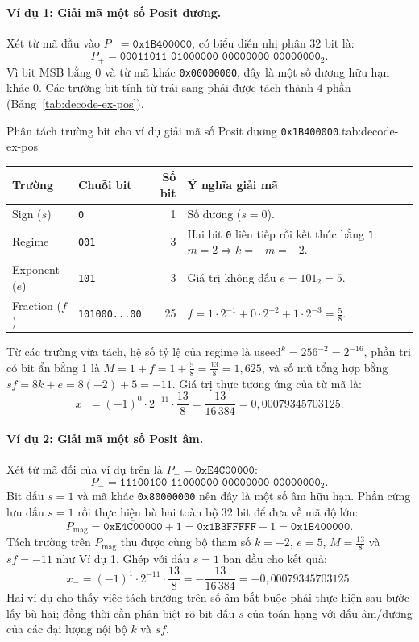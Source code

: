 \paragraph{Ví dụ 1: Giải mã một số Posit dương.}
Xét từ mã đầu vào $P_+ = \texttt{0x1B400000}$, có biểu diễn nhị phân 32 bit là:
\[
P_+ = \texttt{00011011\ 01000000\ 00000000\ 00000000}_2.
\]
Vì bit MSB bằng $0$ và từ mã khác \texttt{0x00000000}, đây là một số dương hữu
hạn khác $0$. Các trường bit tính từ trái sang phải được tách thành 4 phần (Bảng~\ref{tab:decode-ex-pos}).

\begin{engineeringtable}{Phân tách trường bit cho ví dụ giải mã số Posit dương \texttt{0x1B400000}.}{tab:decode-ex-pos}
\begin{tabularx}{\linewidth}{@{}>{\raggedright\arraybackslash}p{26mm} l r Y@{}}
\toprule
Trường & Chuỗi bit & Số bit & Ý nghĩa giải mã \\
\midrule
Sign ($s$) & \texttt{0} & 1 & Số dương ($s=0$). \\
Regime & \texttt{001} & 3 & Hai bit \texttt{0} liên tiếp rồi kết thúc bằng \texttt{1}: $m=2 \Rightarrow k=-m=-2$. \\
Exponent ($e$) & \texttt{101} & 3 & Giá trị không dấu $e = 101_2 = 5$. \\
Fraction ($f$) & \texttt{101000...00} & 25 & $f = 1\cdot 2^{-1} + 0\cdot 2^{-2} + 1\cdot 2^{-3} = \frac{5}{8}$. \\
\bottomrule
\end{tabularx}
\end{engineeringtable}

Từ các trường vừa tách, hệ số tỷ lệ của regime là $\mathrm{useed}^k = 256^{-2} = 2^{-16}$,
phần trị có bit ẩn bằng 1 là $M = 1 + f = 1 + \frac{5}{8} = \frac{13}{8} = 1{,}625$,
và số mũ tổng hợp bằng $sf = 8k + e = 8(-2) + 5 = -11$. Giá trị thực tương ứng của
từ mã là:
\[
x_+ = (-1)^0 \cdot 2^{-11} \cdot \frac{13}{8} = \frac{13}{16\,384} = 0{,}00079345703125.
\]

\paragraph{Ví dụ 2: Giải mã một số Posit âm.}
Xét từ mã đối của ví dụ trên là $P_- = \texttt{0xE4C00000}$:
\[
P_- = \texttt{11100100\ 11000000\ 00000000\ 00000000}_2.
\]
Bit dấu $s=1$ và mã khác \texttt{0x80000000} nên đây là một số âm hữu hạn. Phần
cứng lưu dấu $s=1$ rồi thực hiện bù hai toàn bộ 32 bit để đưa về mã độ lớn:
\[
P_{\mathrm{mag}} = \overline{\texttt{0xE4C00000}} + 1 = \texttt{0x1B3FFFFF} + 1 = \texttt{0x1B400000}.
\]
Tách trường trên $P_{\mathrm{mag}}$ thu được cùng bộ tham số $k=-2$, $e=5$,
$M=\frac{13}{8}$ và $sf=-11$ như Ví dụ 1. Ghép với dấu $s=1$ ban đầu cho kết quả:
\[
x_- = (-1)^1 \cdot 2^{-11} \cdot \frac{13}{8} = -\frac{13}{16\,384} = -0{,}00079345703125.
\]
Hai ví dụ cho thấy việc tách trường trên số âm bắt buộc phải thực hiện sau bước
lấy bù hai; đồng thời cần phân biệt rõ bit dấu $s$ của toán hạng với dấu âm/dương
của các đại lượng nội bộ $k$ và $sf$.

